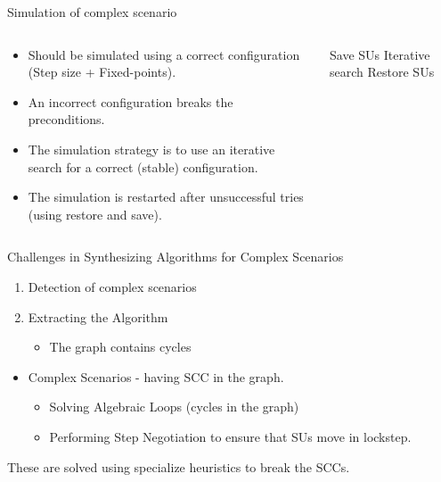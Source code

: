 \documentclass{beamer}
\begin{document}
\begin{frame}{Simulation of complex scenario}
    \begin{columns}[T]
        \begin{column}{0.5\textwidth}
            \begin{itemize}
                \item Should be simulated using a correct configuration (Step size + Fixed-points).
                \item An incorrect configuration breaks the preconditions.
                \item The simulation strategy is to use an iterative search for a correct (stable) configuration.
                \item The simulation is restarted after unsuccessful tries (using restore and save).
            \end{itemize}
        \end{column}
        \begin{column}{0.5\textwidth}
            \begin{algorithm}[H]
                \caption{Simulation of complex scenarios.}
            \label{alg:algorithm_step}
            \begin{algorithmic}[1]
              \scriptsize
                \State Save SUs
                \State Iterative search
                    \State Restore SUs
                \EndIf
                \EndWhile
            \end{algorithmic} 
          \end{algorithm}
        \end{column}
    \end{columns}    
\end{frame}


\begin{frame}{Challenges in Synthesizing Algorithms for Complex Scenarios}
    \begin{enumerate}
        \item Detection of complex scenarios
        \item Extracting the Algorithm
        \begin{itemize}
            \item The graph contains cycles
        \end{itemize}
    \end{enumerate}
    \begin{itemize}
        \item Complex Scenarios - having SCC in the graph.
        \begin{itemize}
            \item Solving Algebraic Loops (cycles in the graph)
            \item Performing Step Negotiation to ensure that SUs move in lockstep.
        \end{itemize}
    \end{itemize}
    These are solved using specialize heuristics to break the SCCs.
\end{frame}
\end{document}

